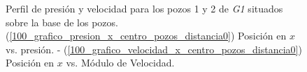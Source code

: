 \documentclass[10pt,a4paper,final]{article}
\begin{document}
\begin{figure}[tbhp]
   \centering
   \hspace{0.1\linewidth}
    \caption{Perfil de presión y velocidad para los pozos 1 y 2 de \emph{G1} situados sobre la base de los pozos. (\ref{100_grafico_presion_x_centro_pozos_distancia0}) Posición en $x$ vs. presión. - (\ref{100_grafico_velocidad_x_centro_pozos_distancia0}) Posición en $x$ vs. Módulo de Velocidad.}
   \label{100_grafico_velocidad_presion_centro_pozos_distancia0}                %
\end{figure}
%
\end{document}
